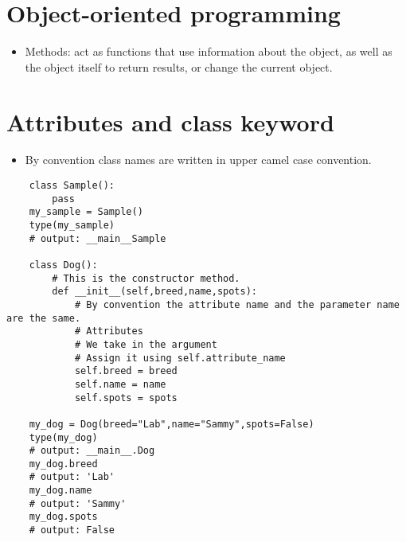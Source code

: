 \section{Object-oriented programming}
\begin{itemize}
    \item Methods: act as functions that use information about the object, as well as the object itself to return results, or change the current object. 
\end{itemize}


\section{Attributes and class keyword}
\begin{itemize}
    \item By convention class names are written in upper camel case convention. 
\end{itemize}
\begin{verbatim}
    class Sample():
        pass
    my_sample = Sample()
    type(my_sample)
    # output: __main__Sample

    class Dog():
        # This is the constructor method.
        def __init__(self,breed,name,spots): 
            # By convention the attribute name and the parameter name are the same.
            # Attributes 
            # We take in the argument 
            # Assign it using self.attribute_name
            self.breed = breed
            self.name = name
            self.spots = spots

    my_dog = Dog(breed="Lab",name="Sammy",spots=False)
    type(my_dog)
    # output: __main__.Dog
    my_dog.breed
    # output: 'Lab'
    my_dog.name
    # output: 'Sammy'
    my_dog.spots
    # output: False
\end{verbatim}

